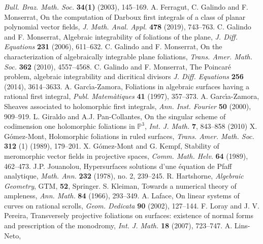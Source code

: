 \documentclass{amsart} %
\theoremstyle{definition}
\newcommand{\PP}{\mathbb{P}}
\begin{document}
\begin{thebibliography}{99}
   {\it Bull. Braz. Math. Soc.} {\bf 34(1)} (2003), 145--169.
 A. Ferragut, C. Galindo and F. Monserrat,
   On the computation of Darboux first integrals of a class of planar polynomial vector fields,
   {\it J. Math. Anal. Appl.} {\bf 478} (2019), 743--763.
 C. Galindo and F. Monserrat,
   Algebraic integrability of foliations of the plane,
   {\it J. Diff. Equations} {\bf 231} (2006), 611--632.
 C. Galindo and F. Monserrat, On the characterization of algebraically integrable
   plane foliations,
   {\it Trans. Amer. Math. Soc.} {\bf 362} (2010), 4557--4568.
 C. Galindo and F. Monserrat,
   The Poincar\'e problem, algebraic integrability and dicritical divisors
   {\it J. Diff. Equations} {\bf 256} (2014), 3614--3633.
 A. Garc\'{\i}a-Zamora,
   Foliations in algebraic surfaces having a rational first integral,
   {\it Publ. Matem\`atiques} {\bf 41} (1997), 357--373.
 A. Garc\'{\i}a-Zamora,
   Sheaves associated to holomorphic first integrals,
   {\it Ann. Inst. Fourier} {\bf 50} (2000), 909--919.
  L. Giraldo and  A.J. Pan-Collantes,
   On the singular scheme of codimension one holomorphic foliations in $ \PP^3 $,
   {\it Int. J. Math.} \textbf{7}, 843–858 (2010)
 X. G\'omez-Mont,
   Holomorphic foliations in ruled surfaces,
   {\it Trans. Amer. Math. Soc.} {\bf 312} (1) (1989), 179--201.
 X. G\'omez-Mont and G. Kempf,
   Stability of meromorphic vector fields in projective spaces,
   {\it Comm. Math. Helv.} {\bf 64} (1989), 462--473.
 J.P. Jouanolou,
   Hypersurfaces solutions d'une \'equation de Pfaff analytique,
   {\it Math. Ann.} {\bf 232} (1978), no. 2, 239--245.
  R. Hartshorne,
   {\em Algebraic Geometry}, GTM, {\bf 52}, Springer.
 S. Kleiman,
   Towards a numerical theory of ampleness,
   {\it Ann. Math.} {\bf 84} (1966), 293--349.
 A. Laface,
   On linear systems of curves on rational scrolls,
   {\it Geom. Dedicata} {\bf 90} (2002), 127--144.
 F. Loray and J. V. Pereira,
   Transversely projective foliations on surfaces: existence of normal forms
   and prescription of the monodromy,
   {\it Int. J. Math.} {\bf 18} (2007), 723--747.
 A. Lins-Neto,

\end{thebibliography}
\end{document}
